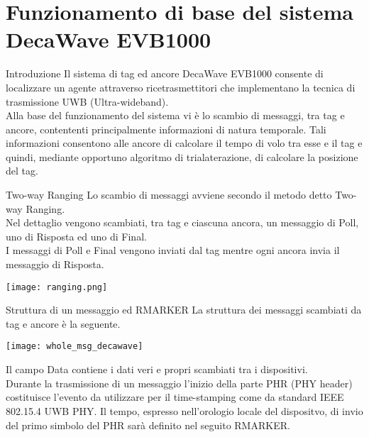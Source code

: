 \section{Funzionamento di base del sistema DecaWave EVB1000}
\begin{frame}{Introduzione}
  Il sistema di tag ed ancore DecaWave EVB1000 consente di localizzare
  un agente attraverso ricetrasmettitori che implementano la tecnica di trasmissione
  \alert{UWB} (Ultra-wideband).\\
  Alla base del funzionamento del sistema vi è lo scambio di messaggi, tra tag e ancore,
  contententi principalmente informazioni di natura temporale. Tali informazioni consentono
  alle ancore di calcolare il tempo di volo tra esse e il tag e quindi, mediante opportuno
  algoritmo di trialaterazione, di calcolare la posizione del tag.
\end{frame}

\begin{frame}{Two-way Ranging}
  Lo scambio di messaggi avviene secondo il metodo detto \alert{Two-way Ranging}.\\
  Nel dettaglio vengono scambiati, tra tag e ciascuna ancora,
  un messaggio di Poll, uno di Risposta ed uno di Final.\\
  I messaggi di \alert{Poll} e \alert{Final} vengono inviati dal tag
  mentre ogni ancora invia il messaggio di \alert{Risposta}.
  \begin{center}
    \texttt{[image: ranging.png]}
  \end{center}
\end{frame}

\begin{frame}{Struttura di un messaggio ed RMARKER}
  La struttura dei messaggi scambiati da tag e ancore è la seguente.
  \begin{center}
    \texttt{[image: whole\_msg\_decawave]}
  \end{center}
  Il campo \alert{Data} contiene i dati veri e propri scambiati tra i dispositivi.\\
  Durante la trasmissione di un messaggio l'inizio della parte PHR (PHY header)
  costituisce l'evento da utilizzare per il time-stamping come da standard
  IEEE 802.15.4 UWB PHY. Il tempo, espresso nell'orologio locale del dispositvo, di invio
  del primo simbolo del PHR sarà definito nel seguito \alert{RMARKER}.
\end{frame}


